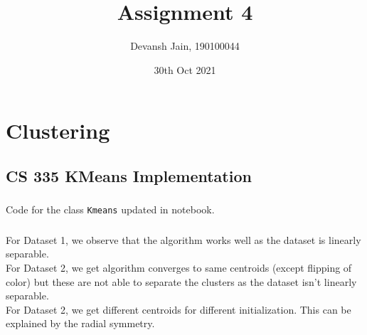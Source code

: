 \documentclass[12pt, fleqn]{article}
\title{Assignment 4}
\author{Devansh Jain, 190100044}
\date{30th Oct 2021}
\begin{document}
\maketitle
\tableofcontents
\thispagestyle{empty}
\setcounter{page}{0}

\newpage
\section{Clustering}
\subsection{CS 335 KMeans Implementation}
\subsubsection{}
Code for the class \verb!Kmeans! updated in notebook.

\subsubsection{}
For Dataset 1, we observe that the algorithm works well as the dataset is linearly separable. \\
For Dataset 2, we get algorithm converges to same centroids (except flipping of color) but these are not able to separate the clusters as the dataset isn't linearly separable. \\
For Dataset 2, we get different centroids for different initialization. This can be explained by the radial symmetry. \\
\end{document}
